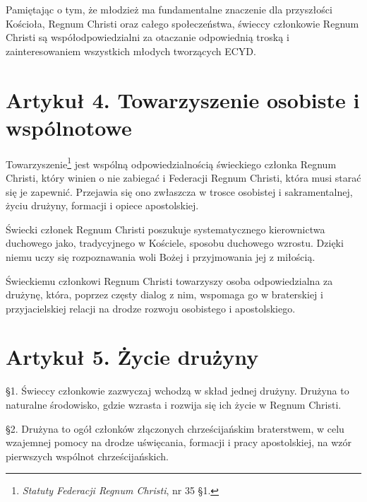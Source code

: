 \filbreak{}

 Pamiętając o tym, że młodzież ma fundamentalne znaczenie dla przyszłości Kościoła, Regnum Christi oraz całego społeczeństwa, świeccy członkowie Regnum Christi są współodpowiedzialni za otaczanie odpowiednią troską i zainteresowaniem wszystkich młodych tworzących ECYD.


\section{Artykuł 4. Towarzyszenie osobiste i wspólnotowe}


 Towarzyszenie\footnote{{\em Statuty Federacji Regnum Christi}, nr 35 \S{}1.} jest wspólną odpowiedzialnością świeckiego członka Regnum Christi, który winien o nie zabiegać i Federacji Regnum Christi, która musi starać się je zapewnić. Przejawia się ono zwłaszcza w trosce osobistej i sakramentalnej, życiu drużyny, formacji i opiece apostolskiej.


 Świecki członek Regnum Christi poszukuje systematycznego kierownictwa duchowego jako, tradycyjnego w Kościele, sposobu duchowego wzrostu. Dzięki niemu uczy się rozpoznawania woli Bożej i przyjmowania jej z miłością. 

\filbreak{}

 Świeckiemu członkowi Regnum Christi towarzyszy osoba odpowiedzialna za drużynę, która, poprzez częsty dialog z nim, wspomaga go w braterskiej i przyjacielskiej relacji na drodze rozwoju osobistego i apostolskiego.


\section{Artykuł 5. Życie drużyny}


 \S{}1. Świeccy członkowie zazwyczaj wchodzą w skład jednej drużyny. Drużyna to naturalne środowisko, gdzie wzrasta i rozwija się ich życie w Regnum Christi.

\S{}2. Drużyna to ogół członków złączonych chrześcijańskim braterstwem, w celu wzajemnej pomocy na drodze uświęcania, formacji i pracy apostolskiej, na wzór pierwszych wspólnot chrześcijańskich.

